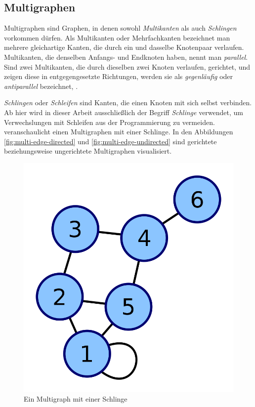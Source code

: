         \subsection{Multigraphen}

            Multigraphen sind Graphen, in denen sowohl \emph{Multikanten} als auch \emph{Schlingen} vorkommen dürfen. Als Multikanten oder Mehrfachkanten bezeichnet man mehrere gleichartige Kanten, die durch ein und dasselbe Knotenpaar verlaufen. Multikanten, die denselben Anfangs- und Endknoten haben, nennt man \emph{parallel}. Sind zwei Multikanten, die durch dieselben zwei Knoten verlaufen, gerichtet, und zeigen diese in entgegengesetzte Richtungen, werden sie als \emph{gegenläufig} oder \emph{antiparallel} bezeichnet, . \cite{EZ:Web29, EZ:Web39}
            
            \emph{Schlingen} oder \emph{Schleifen} sind Kanten, die einen Knoten mit sich selbst verbinden. Ab hier wird in dieser Arbeit ausschließlich der Begriff \emph{Schlinge} verwendet, um Verwechslungen mit Schleifen aus der Programmierung zu vermeiden.  veranschaulicht einen Multigraphen mit einer Schlinge. In den Abbildungen \ref{fig:multi-edge-directed} und \ref{fig:multi-edge-undirected} sind gerichtete beziehungsweise ungerichtete Multigraphen visualisiert. \cite{EZ:Web27, EZ:Web28, EZ:Web39}

            \begin{figure}
                \centering
                \includegraphics[width=0.4\linewidth]{images/loop.png}
                \caption{Ein Multigraph mit einer Schlinge\\\cite{EZ:Web27, EZ:Web28}}
                \label{fig:loop}
            \end{figure}


